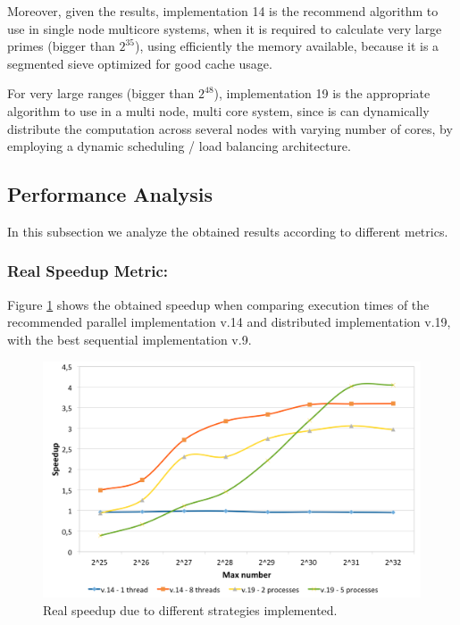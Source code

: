 \documentclass[runningheads,a4paper]{llncs}
\begin{document}
Moreover, given the results, implementation 14 is the recommend algorithm to use in single node multicore systems, when it is required to calculate very large primes (bigger than $2^{35}$), using efficiently the memory available, because it is a segmented sieve optimized for good cache usage.

For very large ranges (bigger than $2^{48}$), implementation 19 is the appropriate algorithm to use in a multi node, multi core system, since is can dynamically distribute the computation across several nodes with varying number of cores, by employing a dynamic scheduling / load balancing architecture.


\subsection{Performance Analysis}
\label{Performance Analysis}

In this subsection we analyze the obtained results according to different metrics.

\subsubsection{Real Speedup Metric:}
\label{Real Speedup Metric:}

Figure \ref{fig:real_speed_up} shows the obtained speedup when comparing execution times of the recommended parallel implementation v.14 and distributed implementation v.19, with the best sequential implementation v.9.

\begin{figure}[h]
        \centering
        \includegraphics[height=7.0cm]{images/real_speed_up}
        \caption{Real speedup due to different strategies implemented.}
        \label{fig:real_speed_up}
\end{figure}
\end{document}
